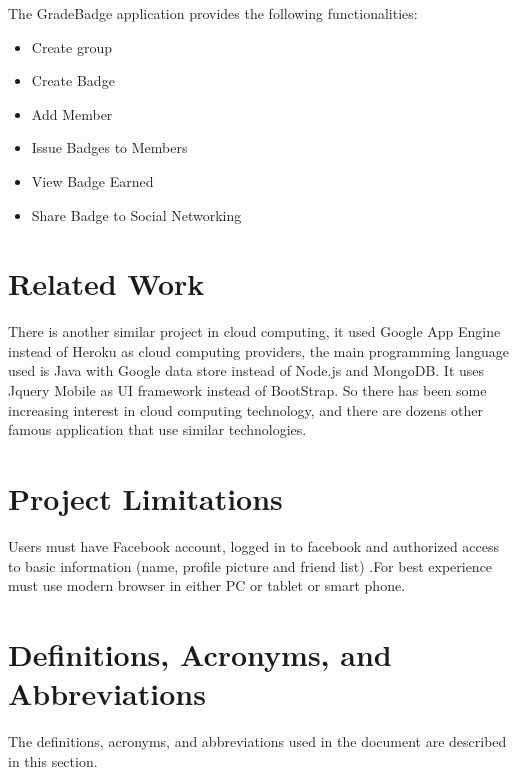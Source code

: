 The GradeBadge application provides the following functionalities:
\begin{itemize}
\item Create group
\item Create Badge 
\item Add Member
\item Issue Badges to Members
\item View Badge Earned
\item Share Badge to Social Networking 
\end{itemize}

\section{Related Work}
There is another similar project in cloud computing, it used Google App Engine instead of Heroku as cloud computing providers, the main programming language used is Java with Google data store instead of Node.js and MongoDB. It uses Jquery Mobile as UI framework instead of BootStrap.   \cite{Manoj}
So there has been some increasing interest in cloud computing technology, and there are dozens other famous application that use similar technologies.  


\section{Project Limitations}
Users must have Facebook account,  logged in to facebook and authorized access to basic information (name, profile picture and friend list) .For best experience must use modern browser in either PC or tablet or smart phone.    

\section{Definitions, Acronyms, and Abbreviations}

The definitions, acronyms, and abbreviations used in the document are described in this section.

